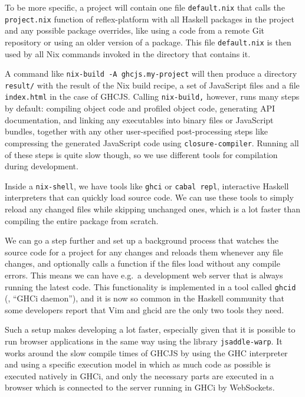 \documentclass[english,zadani,odsaz]{fitthesis}
\begin{document}
To be more specific, a project will contain one file \texttt{default.nix} that calls the
\texttt{project.nix} function of reflex-platform with all Haskell packages in the project
and any possible package overrides, like using a code from a remote Git
repository or using an older version of a package. This file \texttt{default.nix} is then
used by all Nix commands invoked in the directory that contains it.

A command like \texttt{nix-build -A ghcjs.my-project} will then produce a directory
\texttt{result/} with the result of the Nix build recipe, a set of JavaScript files and a
file \texttt{index.html} in the case of GHCJS. Calling \texttt{nix-build,} however, runs many steps
by default: compiling object code and profiled object code, generating API
documentation, and linking any executables into binary files or JavaScript
bundles, together with any other user-specified post-processing steps like
compressing the generated JavaScript code using \texttt{closure-compiler}. Running all of
these steps is quite slow though, so we use different tools for compilation
during development.

Inside a \texttt{nix-shell}, we have tools like \texttt{ghci} or \texttt{cabal repl}, interactive Haskell
interpreters that can quickly load source code. We can use these tools to simply
reload any changed files while skipping unchanged ones, which is a lot faster
than compiling the entire package from scratch.

We can go a step further and set up a background process that watches the source
code for a project for any changes and reloads them whenever any file changes,
and optionally calls a function if the files load without any compile
errors. This means we can have e.g.~a development web server that is always
running the latest code. This functionality is implemented in a tool called
\texttt{ghcid} (\cite{ghcid}, ``GHCi daemon''), and it is now so common in the Haskell
community that some developers report that Vim and ghcid are the only two tools
they need.

Such a setup makes developing a lot faster, especially given that it is possible
to run browser applications in the same way using the library \texttt{jsaddle-warp}. It
works around the slow compile times of GHCJS by using the GHC interpreter and
using a specific execution model in which as much code as possible is executed
natively in GHCi, and only the necessary parts are executed in a browser which
is connected to the server running in GHCi by WebSockets.
\end{document}
